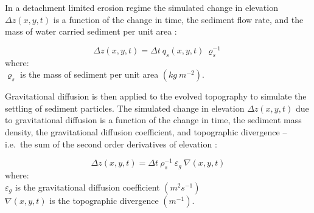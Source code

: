 \documentclass[final,3p,times,twocolumn]{elsarticle}
\begin{document}
In a detachment limited erosion regime
the simulated change in elevation $\Delta z(x,y,t)$
is a function of
the change in time, the sediment flow rate, and the mass of water carried sediment per unit area
\cite{mitasova2013}:

\begin{equation}
\label{eq:flux_evolution} 
{\Delta z(x,y,t) = \Delta t ~ q_s(x,y,t) ~ \varrho_s^{-1} } 
\end{equation}
%
{\small
\noindent
where: \\
\noindent
\hspace*{0.5em} $\varrho_s$ is the mass of sediment per unit area $(kg ~ m^{-2})$.\\
}

\noindent
Gravitational diffusion is then applied to the evolved topography
to simulate the settling of sediment particles. 
The simulated change in elevation $\Delta z(x,y,t) $ due to gravitational diffusion 
is a function of the change in time, the sediment mass density, 
the gravitational diffusion coefficient, and topographic divergence 
-- i.e.~the sum of the second order derivatives of elevation
\cite{thaxton2004}:

\begin{equation}
\label{eq:grav_diffusion} 
{\Delta z(x,y,t) = \Delta t ~ \rho_s^{-1} ~ \varepsilon_g ~ \nabla(x,y,t)}
\end{equation}
%
{\small
\noindent
where: \\
\noindent
\hspace*{0.5em} $\varepsilon_g$ is the gravitational diffusion coefficient $(m^{2} s^{-1})$\\ %
\hspace*{0.5em} $\nabla(x,y,t)$ is the topographic divergence $(m^{-1})$.\\
}
\end{document}

